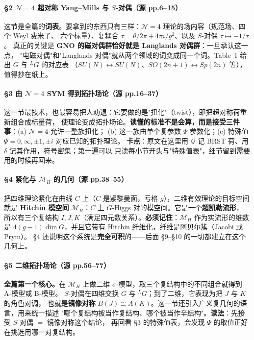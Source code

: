 \documentclass[11pt,a4paper]{article}
\newcommand{\MH}{\mathcal{M}_H}
\newcommand{\Ldual}{{}^L\!G}
\newcommand{\Nfour}{\mathcal{N}=4}
\begin{document}
\paragraph{\S2 $\Nfour$ 超对称 Yang--Mills 与 $S$-对偶（源 pp.6--15）}
这节是全篇的\textbf{词表}。要拿到的东西只有三样：$\Nfour$ 理论的场内容（规范场、四个 Weyl 费米子、
六个标量）、复耦合 $\tau=\theta/2\pi+4\pi i/g^2$、以及 $S$-对偶 $\tau\mapsto-1/\tau$。
真正的关键是 \textbf{GNO 的磁对偶群恰好就是 Langlands 对偶群}：一旦承认这一点，
"电磁对偶"和"Langlands 对偶"就从两个领域的词变成同一个词。Table~1 给出 $G$ 与 $\Ldual$ 的对应表
（$SU(N)\leftrightarrow SU(N)$、$SO(2n+1)\leftrightarrow Sp(2n)$ 等），值得抄在纸上。

\paragraph{\S3 由 $\Nfour$ SYM 得到拓扑场论（源 pp.16--37）}
这一节最技术，也最容易把人劝退：它要做的是"扭化"（twist），即把超对称荷重新组合成标量荷，
使理论变成拓扑场论。\textbf{读懂的标准不是会算，而是接受三件事}：(a) $\Nfour$ 允许一整族扭化；
(b) 这一族由单个复参数 $\Psi$ 参数化；(c) 特殊值 $\Psi=0,\infty,\pm1,\pm i$ 对应已知的拓扑理论。
\textbf{卡点}：原文在这里用 $\mathcal{Q}$ 记 BRST 荷、用 $\delta$ 记其作用，符号密集；第一遍可以
只读每小节开头与"特殊值表"，细节留到需要用的时候再回来。

\paragraph{\S4 紧化与 $\MH$ 的几何（源 pp.38--55）}
把四维理论紧化在曲线 $C$ 上（$C$ 是紧黎曼面，亏格 $g$），二维有效理论的目标空间就是
\textbf{Hitchin 模空间} $\MH$：$C$ 上 $G$-Higgs 对的模空间。它是一个\textbf{超凯勒流形}，
所以有三个复结构 $I,J,K$（满足四元数关系）。\textbf{必须记住}：$\MH$ 作为实流形的维数是
$4(g-1)\dim G$，并且它带有 Hitchin 纤维化，纤维是阿贝尔簇（Jacobi 或 Prym）。
\S4 还说明这个系统是\textbf{完全可积}的——后面 \S9--\S10 的一切都建立在这个几何上。

\paragraph{\S5 二维拓扑场论（源 pp.56--77）}
\textbf{全篇第一个核心。}在 $\MH${} 上做二维 $\sigma$-模型，取三个复结构中的不同组合就得到 A-模型或 B-模型。
$S$-对偶在四维交换 $G$ 与 $\Ldual$；到了二维，它表现为把 $J$ 与 $K$ 的角色对调，
也就是\textbf{镜像对称} $B(J)\cong A(K)$。这一节还引入广义复几何的语言，用来统一描述
"哪个复结构被当作复结构、哪个被当作辛结构"。\textbf{读法}：先接受 $S$-对偶 $=$ 镜像对称这个结论，
再回看 \S3 的特殊值表，会发现 $\Psi$ 的取值正好在挑选用哪一对复结构。
\end{document}

